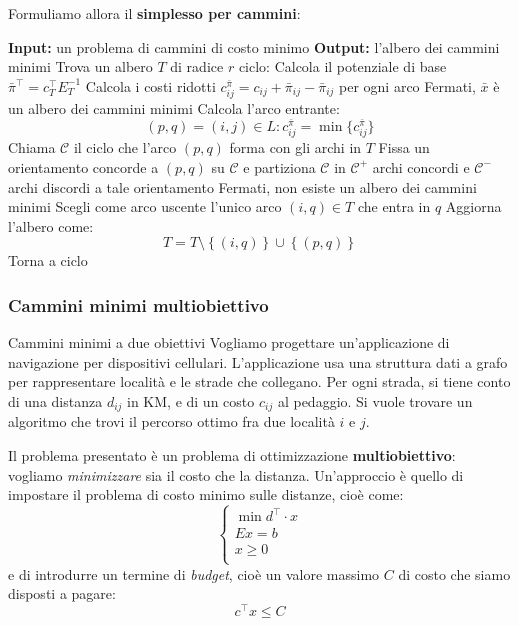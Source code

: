 \documentclass[a4paper,11pt]{article}
\begin{document}
Formuliamo allora il \textbf{simplesso per cammini}:
\begin{algorithm}[H]
\caption{del simplesso per cammini}
\begin{algorithmic}
	\STATE \textbf{Input:} un problema di cammini di costo minimo 
	\STATE \textbf{Output:} l'albero dei cammini minimi 
	\STATE Trova un albero $T$ di radice $r$ 
	\STATE \textsf{ciclo:}
	\STATE Calcola il potenziale di base $\bar{\pi}^\intercal = c_T^\intercal E_T^{-1}$
	\STATE Calcola i costi ridotti $c_{ij}^{\bar{\pi}} = c_{ij} + \bar{\pi}_{ij} - \bar{\pi}_{ij}$ per ogni arco
	\STATE Fermati, $\bar{x}$ è un albero dei cammini minimi 
\ELSE
		\STATE Calcola l'arco entrante: 
		$$
		(p, q) = (i, j) \in L : c_{ij}^{\bar{\pi}} = \min \{ c_{ij}^{\bar{\pi}} \} 
		$$
		\STATE Chiama $\mathcal{C}$ il ciclo che l'arco $(p, q)$ forma con gli archi in $T$
		\STATE Fissa un orientamento concorde a $(p,q)$ su $\mathcal{C}$ e partiziona $\mathcal{C}$ in $\mathcal{C^+}$ archi concordi e $\mathcal{C^-}$ archi discordi a tale orientamento
	\ENDIF
		\STATE Fermati, non esiste un albero dei cammini minimi 
	\ELSE
		\STATE Scegli come arco uscente l'unico arco $(i, q) \in T$ che entra in $q$ 
	\ENDIF
	\STATE Aggiorna l'albero come:
	$$
	T = T \setminus \left\{ (i, q) \right\} \cup \left\{ (p, q) \right\} 
	$$
	\STATE Torna a \textsf{ciclo}
\end{algorithmic}
\end{algorithm}

\subsubsection{Cammini minimi multiobiettivo}
\begin{problem}{Cammini minimi a due obiettivi}
	Vogliamo progettare un'applicazione di navigazione per dispositivi cellulari.
	L'applicazione usa una struttura dati a grafo per rappresentare località e le strade che collegano.
	Per ogni strada, si tiene conto di una distanza $d_{ij}$ in KM, e di un costo $c_{ij}$ al pedaggio.
	Si vuole trovare un algoritmo che trovi il percorso ottimo fra due località $i$ e $j$.
\end{problem}

Il problema presentato è un problema di ottimizzazione \textbf{multiobiettivo}: vogliamo \textit{minimizzare} sia il costo che la distanza.
Un'approccio è quello di impostare il problema di costo minimo sulle distanze, cioè come:
\[
	\begin{cases}
		\min d^\intercal \cdot x \\ 
		Ex = b \\ 
		x \geq 0 \\ 
	\end{cases}
\]
e di introdurre un termine di \textit{budget}, cioè un valore massimo $C$ di costo che siamo disposti a pagare:
$$
c^\intercal x \leq C
$$
\end{document}
